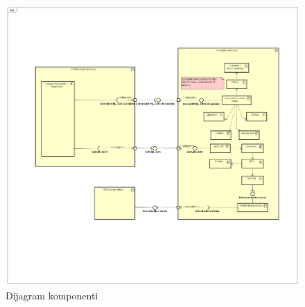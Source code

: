 			 \begin{figure}[H]
				\includegraphics[scale=0.5]{slike/dijagram_komponenti.png} %
				\centering
				\caption{Dijagram komponenti}
				\label{fig:promjene}
			\end{figure}
			 
		\fi